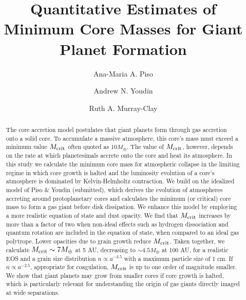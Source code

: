 \documentclass[apj]{emulateapj}
\begin{document}



\title{Quantitative Estimates of Minimum Core Masses for Giant Planet Formation}
\author{Ana-Maria A. Piso}
\author{Andrew N. Youdin}
\author{Ruth A. Murray-Clay}

\begin{abstract}

The core accretion model postulates that giant planets form through gas accretion onto a solid core. To accumulate a massive atmosphere, this core's mass must exceed a minimum value $M_{\rm crit}$ often quoted as $10 M_{\oplus}$. The value of $M_{\rm crit}$, however, depends on the rate at which planetesimals accrete onto the core and heat its atmosphere. In this study we calculate the minimum core mass for atmospheric collapse in the limiting regime in which core growth is halted and the luminosity evolution of a core's atmosphere is dominated by Kelvin-Helmholtz contraction. We build on the idealized model of Piso \& Youdin (submitted), which derives the evolution of atmospheres accreting around protoplanetary cores and calculates the minimum (or critical) core mass to form a gas giant before disk dissipation. We enhance this model by employing a more realistic equation of state and dust opacity. We find that $M_{\rm crit}$ increases by more than a factor of two when non-ideal effects such as hydrogen dissociation and quantum rotation are included in the equation of state, when compared to an ideal gas polytrope. Lower opacities due to grain growth reduce $M_{\rm crit}$. Taken together, we calculate $M_{\rm crit} \sim 7 M_{\oplus}$ at 5 AU, decreasing to $\sim$$4.5 M_{\oplus}$ at 100 AU, for a realistic EOS and a grain size distribution $n \propto a^{-3.5}$ with a maximum particle size of 1 cm. If $n \propto a^{-2.5}$, appropriate for coagulation, $M_{\rm crit}$ is up to one order of magnitude smaller. We show that giant planets may grow from smaller cores if core growth is halted, which is particularly relevant for understanding the origin of gas giants directly imaged at wide separations.  




\end{abstract}
\end{document}
